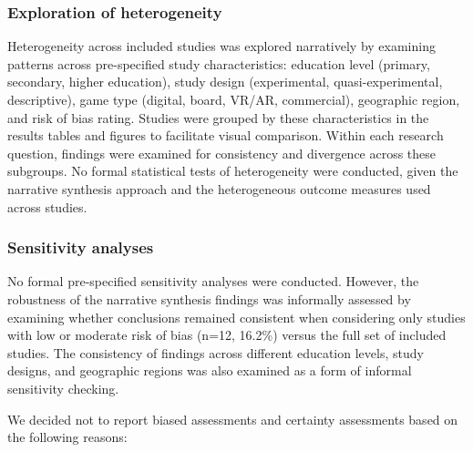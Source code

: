 \documentclass[a4paper,fleqn]{cas-sc}
\begin{document}
\subsubsection{Exploration of heterogeneity}

Heterogeneity across included studies was explored narratively by examining patterns across pre-specified study characteristics: education level (primary, secondary, higher education), study design (experimental, quasi-experimental, descriptive), game type (digital, board, VR/AR, commercial), geographic region, and risk of bias rating. Studies were grouped by these characteristics in the results tables and figures to facilitate visual comparison. Within each research question, findings were examined for consistency and divergence across these subgroups. No formal statistical tests of heterogeneity were conducted, given the narrative synthesis approach and the heterogeneous outcome measures used across studies.

\subsubsection{Sensitivity analyses}

No formal pre-specified sensitivity analyses were conducted. However, the robustness of the narrative synthesis findings was informally assessed by examining whether conclusions remained consistent when considering only studies with low or moderate risk of bias (n=12, 16.2\%) versus the full set of included studies. The consistency of findings across different education levels, study designs, and geographic regions was also examined as a form of informal sensitivity checking.

We decided not to report biased assessments and certainty assessments based on the following reasons:
\end{document}
